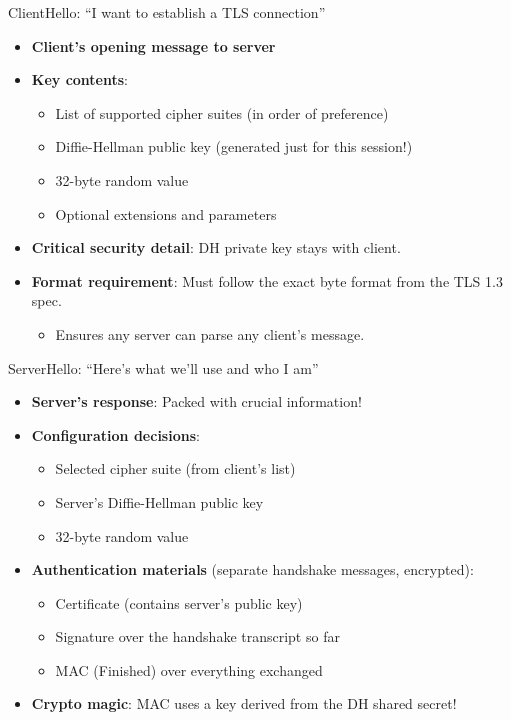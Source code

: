 \ifdefined\PRESENTATION\else\PassOptionsToClass{handout}{beamer}\fi\documentclass[aspectratio=169, lualatex]{beamer}
\begin{document}
\begin{frame}{ClientHello: ``I want to establish a TLS connection''}
	\begin{itemize}[<+->]
		\item \textbf{Client's opening message to server}
		\item \textbf{Key contents}:
		      \begin{itemize}
			      \item List of supported cipher suites (in order of preference)
			      \item Diffie-Hellman public key (generated just for this session!)
			      \item 32-byte random value
			      \item Optional extensions and parameters
		      \end{itemize}
		\item \textbf{Critical security detail}: DH private key stays with client.
		\item \textbf{Format requirement}: Must follow the exact byte format from the TLS 1.3 spec.
		      \begin{itemize}
			      \item Ensures any server can parse any client's message.
		      \end{itemize}
	\end{itemize}
\end{frame}

\begin{frame}{ServerHello: ``Here's what we'll use and who I am''}
	\begin{itemize}[<+->]
		\item \textbf{Server's response}: Packed with crucial information!
		\item \textbf{Configuration decisions}:
		      \begin{itemize}
			      \item Selected cipher suite (from client's list)
			      \item Server's Diffie-Hellman public key
			      \item 32-byte random value
		      \end{itemize}
		\item \textbf{Authentication materials} (separate handshake messages, encrypted):
		      \begin{itemize}
			      \item Certificate (contains server's public key)
			      \item Signature over the handshake transcript so far
			      \item MAC (Finished) over everything exchanged
		      \end{itemize}
		\item \textbf{Crypto magic}: MAC uses a key derived from the DH shared secret!
	\end{itemize}
\end{frame}
\end{document}
